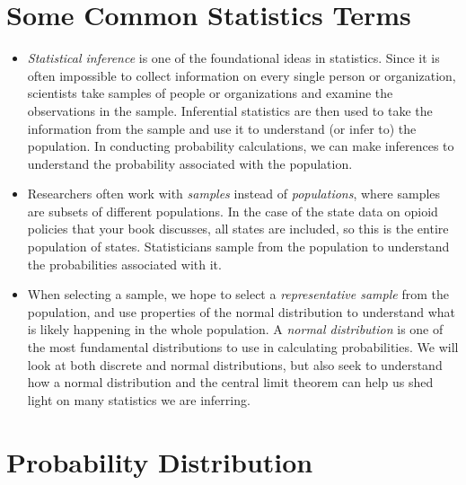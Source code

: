\documentclass[
  letterpaper,
  DIV=11,
  numbers=noendperiod]{scrreprt}
\begin{document}

\chapter{Some Common Statistics
Terms}\label{some-common-statistics-terms}

\begin{itemize}
\item
  \emph{Statistical inference} is one of the foundational ideas in
  statistics. Since it is often impossible to collect information on
  every single person or organization, scientists take samples of people
  or organizations and examine the observations in the sample.
  Inferential statistics are then used to take the information from the
  sample and use it to understand (or infer to) the population. In
  conducting probability calculations, we can make inferences to
  understand the probability associated with the population.
\item
  Researchers often work with \emph{samples} instead of
  \emph{populations}, where samples are subsets of different
  populations. In the case of the state data on opioid policies that
  your book discusses, all states are included, so this is the entire
  population of states. Statisticians sample from the population to
  understand the probabilities associated with it.
\item
  When selecting a sample, we hope to select a \emph{representative
  sample} from the population, and use properties of the normal
  distribution to understand what is likely happening in the whole
  population. A \emph{normal distribution} is one of the most
  fundamental distributions to use in calculating probabilities. We will
  look at both discrete and normal distributions, but also seek to
  understand how a normal distribution and the central limit theorem can
  help us shed light on many statistics we are inferring.
\end{itemize}


\chapter{Probability Distribution}\label{probability-distribution}
\end{document}
